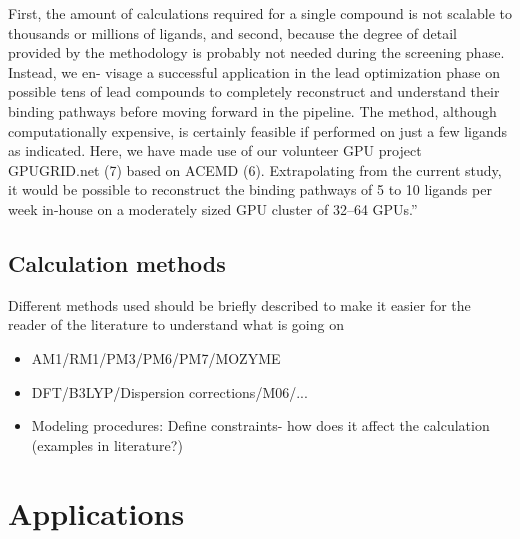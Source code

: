 \begin{itemize}
{First, the amount of calculations required for a single compound is not scalable to thousands or millions of ligands, and second, because the degree of detail provided by the methodology is probably not needed during the screening phase.
Instead, we en- visage a successful application in the lead optimization phase on possible tens of lead compounds to completely reconstruct and understand their binding pathways before moving forward in the pipeline.
The method, although computationally expensive, is certainly feasible if performed on just a few ligands as indicated.
Here, we have made use of our volunteer GPU project GPUGRID.net (7) based on ACEMD (6).
Extrapolating from the current study, it would be possible to reconstruct the binding pathways of 5 to 10 ligands per week in-house on a moderately sized GPU cluster of 32–64 GPUs.}''\cite{buch2011complete}
\end{itemize}

\subsection{Calculation methods}
Different methods used should be briefly described to make it easier for the reader of the literature to understand what is going on
\begin{itemize}
\item AM1/RM1/PM3/PM6/PM7/MOZYME
\item DFT/B3LYP/Dispersion corrections/M06/...
\item Modeling procedures: Define constraints- how does it affect the calculation (examples in literature?)
\end{itemize}


\section{Applications}\label{sec:apps}

